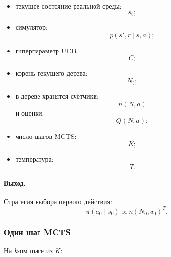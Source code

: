\documentclass[12pt,a4paper]{article}
\begin{document}
\begin{itemize}
    \item текущее состояние реальной среды:
    \[
    s_0;
    \]

    \item симулятор:
    \[
    p(s',r\mid s,a);
    \]

    \item гиперпараметр UCB:
    \[
    C;
    \]

    \item корень текущего дерева:
    \[
    N_0;
    \]

    \item в дереве хранятся счётчики:
    \[
    n(N,a)
    \]
    и оценки:
    \[
    Q(N,a);
    \]

    \item число шагов MCTS:
    \[
    K;
    \]

    \item температура:
    \[
    T.
    \]
\end{itemize}

\paragraph{Выход.}

Стратегия выбора первого действия:
\[
\pi(a_0\mid s_0)
\propto
n(N_0,a_0)^T.
\]

\subsubsection{Один шаг MCTS}

На $k$-ом шаге из $K$:
\end{document}
